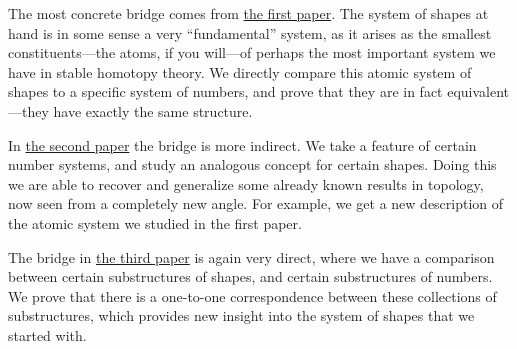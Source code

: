 The most concrete bridge comes from {\hyperref[ch1]{the first paper}}. The system of shapes at hand is in some sense a very ``fundamental'' system, as it arises as the smallest constituents---the atoms, if you will---of perhaps the most important system we have in stable homotopy theory. We directly compare this atomic system of shapes to a specific system of numbers, and prove that they are in fact equivalent---they have exactly the same structure. 

In {\hyperref[ch2]{the second paper}} the bridge is more indirect. We take a feature of certain number systems, and study an analogous concept for certain shapes. Doing this we are able to recover and generalize some already known results in topology, now seen from a completely new angle. For example, we get a new description of the atomic system we studied in the first paper. 

The bridge in {\hyperref[ch3]{the third paper}} is again very direct, where we have a comparison between certain substructures of shapes, and certain substructures of numbers. We prove that there is a one-to-one correspondence between these collections of substructures, which provides new insight into the system of shapes that we started with. 
  